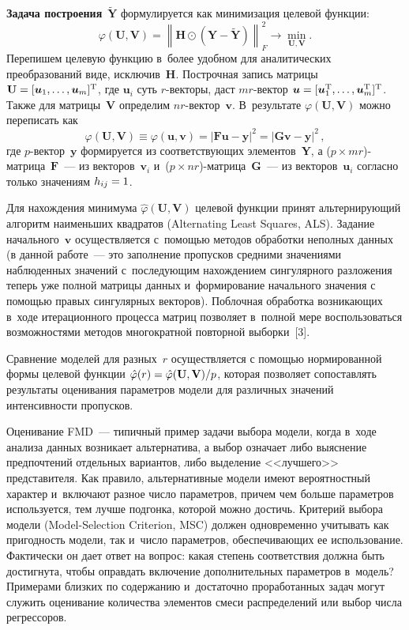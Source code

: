 \begin{multicols}{2}
     \textbf{Задача построения}~$\tilde{\mathbf{Y}}$ формулируется как 
минимизация целевой функции:
     $$
     \varphi(\mathbf{U},\mathbf{V}) =\left\| \mathbf{H}\odot (\mathbf{Y}-
\tilde{\mathbf{Y}} )\right\|^2_F \to \min\limits_{\mathbf{U},\mathbf{V}}.
     $$
Перепишем целевую функцию в~более удобном для аналитических 
преобразований виде, исключив~$\mathbf{H}$. Построчная запись матрицы 
$\mathbf{U}\hm= [\bm{u}_1, \ldots, \bm{u}_m]^{\mathrm{T}}$, где $\bm{u}_i$ 
суть $r$-век\-то\-ры, даст $mr$-век\-тор $\bm{u}\hm= [\bm{u}_1^{\mathrm{T}}, 
\ldots , \bm{u}_m^{\mathrm{T}}]^{\mathrm{T}}$. Также для 
матрицы~$\mathbf{V}$ определим $nr$-век\-тор~$\bm{v}$. В~результате 
$\varphi(\mathbf{U},\mathbf{V})$ можно переписать как
$$
\varphi(\mathbf{U},\mathbf{V}) \equiv \varphi(\bm{u},\bm{v}) =\vert 
\mathbf{F}\bm{u} -\bm{y}\vert^2 =\vert \mathbf{G}\bm{v} -\bm{y}\vert^2\,,
$$
где $p$-век\-тор~$\bm{y}$ формируется из соответствующих 
элементов~$\mathbf{Y}$, а ($p\times mr$)-мат\-ри\-ца~$\mathbf{F}$~--- из 
векторов~$\bm{v}_i$ и~($p\times nr$)-мат\-ри\-ца~$\mathbf{G}$~--- из 
векторов~$\bm{u}_i$ согласно только значениям $h_{ij}\hm=1$. 

     Для нахождения минимума $\hat{\varphi}(\mathbf{U},\mathbf{V})$ 
целевой функции принят альтернирующий алгоритм наименьших квадратов 
(Alternating Least Squares, ALS). Задание начального~$\bm{v}$ осуществляется 
с~по\-мощью методов обработки неполных данных (в данной работе~--- это 
заполнение пропусков средними значениями наблюденных значений 
с~последующим нахождением сингулярного разложения теперь уже полной 
матрицы данных и~формирование начального значения с помощью правых 
сингулярных векторов). Поблочная обработка возникающих в~ходе 
итерационного процесса матриц позволяет в~полной мере воспользоваться 
возможностями методов многократной повторной выборки~[3]. 
     
     Сравнение моделей для разных~$r$ осуществляется с помощью 
нормированной формы целевой функции $\hat{\varphi}(r)\hm= 
\hat{\varphi}(\mathbf{U},\mathbf{V})/p$, которая позволяет сопоставлять 
результаты оценивания параметров модели для различных значений 
интенсивности пропусков.
     
     Оценивание FMD~--- типичный пример задачи выбора модели, когда 
в~ходе анализа данных возникает альтернатива, а выбор означает либо 
выяснение предпочтений отдельных вариантов, либо выделение <<лучшего>> 
представителя. Как правило, альтернативные модели имеют вероятностный 
характер и~включают разное число параметров, причем чем больше параметров 
используется, тем лучше подгонка, которой можно достичь. Критерий выбора 
модели (Model-Selection Criterion, MSC) должен одновременно учитывать как 
пригодность модели, так и~число параметров, обеспечивающих ее 
использование. Фактически он дает ответ на вопрос: какая степень 
соответствия должна быть достигнута, чтобы оправдать включение 
дополнительных параметров в~модель? Примерами близких по содержанию 
и~достаточно проработанных задач могут служить оценивание количества 
элементов смеси распределений или выбор числа регрессоров. 
     

\end{multicols}
